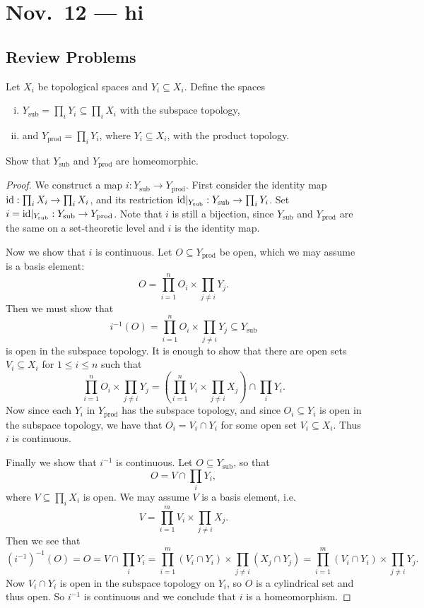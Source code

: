 \chapter{Nov.~12 --- hi}

\section{Review Problems}

\begin{exercise}
  Let $X_i$ be topological spaces
  and $Y_i \subseteq X_i$. Define the spaces
  \begin{enumerate}[(i)]
    \item $Y_{\text{sub}} = \prod_{i} Y_i \subseteq \prod_{i} X_i$ with the subspace topology,
    \item and $Y_{\text{prod}} = \prod_{i} Y_i$, where
      $Y_i \subseteq X_i$, with the product topology.
  \end{enumerate}
  Show that $Y_{\text{sub}}$ and $Y_{\text{prod}}$ are homeomorphic.
\end{exercise}

\begin{proof}
  We construct a map $i : Y_{\text{sub}} \to Y_{\text{prod}}$.
  First consider the identity map
  $\operatorname{id} : \prod_{i} X_i \to \prod_{i} X_i$, and
  its restriction ${\operatorname{id}}|_{Y_{\text{sub}}} : Y_{\text{sub}} \to \prod_{i} Y_i$.
  Set $i = {\operatorname{id}}|_{Y_{\text{sub}}} : Y_{\text{sub}} \to Y_{\text{prod}}$.
  Note that $i$ is still a bijection, since
  $Y_{\text{sub}}$ and $Y_{\text{prod}}$ are the
  same on a set-theoretic level and $i$ is the
  identity map.

  Now we show that $i$ is continuous. Let
  $O \subseteq Y_{\text{prod}}$ be open,
  which we may assume is a basis element:
  \[
    O = \prod_{i = 1}^n O_i \times \prod_{j \ne i} Y_j.
  \]
  Then we must show that
  \[
    i^{-1}(O) = \prod_{i = 1}^n O_i \times \prod_{j \ne i} Y_j \subseteq Y_{\text{sub}}
  \]
  is open in the subspace topology. It is enough to
  show that there are open sets
  $V_i \subseteq X_i$ for $1 \le i \le n$ such
  that
  \[
    \prod_{i = 1}^n O_i \times \prod_{j \ne i} Y_j =
    \left(\prod_{i = 1}^n V_i \times \prod_{j \ne i} X_j\right) \cap \prod_{i} Y_i.
  \]
  Now since each $Y_i$ in $Y_{\text{prod}}$ has
  the subspace topology,
  and since $O_i \subseteq Y_i$ is open in the
  subspace topology, we have that
  $O_i = V_i \cap Y_i$ for some open
  set $V_i \subseteq X_i$. Thus $i$ is continuous.

  Finally we show that $i^{-1}$ is continuous.
  Let $O \subseteq Y_{\text{sub}}$, so that
  \[
    O = V \cap \prod_{i} Y_i,
  \]
  where $V \subseteq \prod_{i} X_i$ is open.
  We may assume $V$ is a basis element, i.e.
  \[
    V = \prod_{i = 1}^m V_i \times \prod_{j \ne i} X_j.
  \]
  Then we see that
  \[
    (i^{-1})^{-1}(O) = O
    = V \cap \prod_{i} Y_i
    = \prod_{i = 1}^m (V_i \cap Y_i) \times \prod_{j \ne i} (X_j \cap Y_j)
    = \prod_{i = 1}^m (V_i \cap Y_i) \times \prod_{j \ne i} Y_j.
  \]
  Now $V_i \cap Y_i$ is open in the subspace
  topology on $Y_i$, so $O$ is a cylindrical set
  and thus open. So $i^{-1}$ is continuous and
  we conclude that $i$ is a homeomorphism.
\end{proof}


